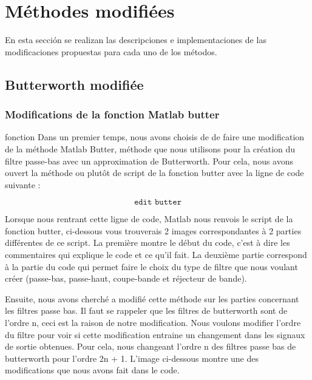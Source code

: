 \documentclass[conference,onecolumn]{IEEEtran}
\begin{document}
\clearpage

\section{Méthodes modifiées}
En esta sección se realizan las descripciones e implementaciones de las modificaciones propuestas para cada uno de los métodos.

\subsection{\textbf{Butterworth modifiée}}

\subsubsection{Modifications de la fonction Matlab butter}

fonction Dans un premier temps, nous avons choisis de de faire une modification de la méthode Matlab Butter, méthode que nous utilisons pour la création du filtre passe-bas avec un approximation de Butterworth. Pour cela, nous avons ouvert la méthode ou plutôt de script de la fonction butter avec la ligne de code suivante :

\[ \texttt{edit butter}\]

Lorsque nous rentrant cette ligne de code, Matlab nous renvois le script de la fonction butter, ci-dessous vous trouverais 2 images correspondantes à 2 parties différentes de ce script. La première montre le début du code, c'est à dire les commentaires qui explique le code et ce qu'il fait. La deuxième partie correspond à la partie du code qui permet faire le choix du type de filtre que nous voulant créer (passe-bas, passe-haut, coupe-bande et réjecteur de bande).



Ensuite, nous avons cherché a modifié cette méthode sur les parties concernant les filtres passe bas. Il faut se rappeler que les filtres de butterworth sont de l’ordre n, ceci est la raison de notre modification. Nous voulons modifier l’ordre du filtre pour voir si cette modification entraine un changement dans les signaux de sortie obtenues. Pour cela, nous changeant l’ordre n des filtres passe bas de butterworth pour l’ordre 2n + 1. L’image ci-dessous montre une des modifications que nous avons fait dans le code.

\end{document}
